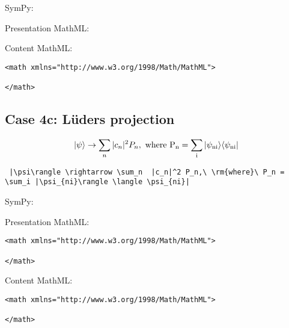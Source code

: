 SymPy:



Presentation MathML:


Content MathML:
\begin{verbatim}
<math xmlns="http://www.w3.org/1998/Math/MathML">

</math>
\end{verbatim}

\subsection{Case 4c: L\"{u}ders projection}
\begin{equation}
 |\psi\rangle \rightarrow \sum_n  |c_n|^2 P_n,\ \rm{where}\ P_n = 
 \sum_i |\psi_{ni}\rangle \langle \psi_{ni}|
\label{eq:Luders_projection_case4c}
\end{equation}

\begin{verbatim}
 |\psi\rangle \rightarrow \sum_n  |c_n|^2 P_n,\ \rm{where}\ P_n = \sum_i |\psi_{ni}\rangle \langle \psi_{ni}|
\end{verbatim}

SymPy:



Presentation MathML:
\begin{verbatim}
<math xmlns="http://www.w3.org/1998/Math/MathML">

</math>
\end{verbatim}

Content MathML:
\begin{verbatim}
<math xmlns="http://www.w3.org/1998/Math/MathML">

</math>
\end{verbatim}
